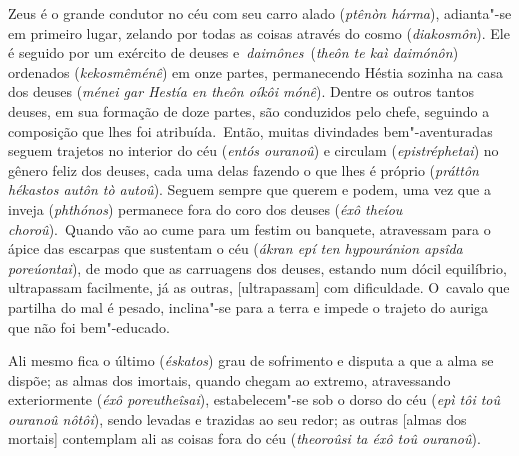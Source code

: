 Zeus é o grande condutor no céu com seu carro alado (\emph{ptênòn
hárma}), adianta"-se em primeiro lugar, zelando por todas as coisas
através do cosmo (\emph{diakosmôn}). Ele é seguido por um exército de
deuses e~\emph{daimônes}~(\emph{theôn te kaì daimónôn}) ordenados
(\emph{kekosmêménê}) em onze partes, permanecendo Héstia sozinha na casa
dos deuses (\emph{ménei gar Hestía en theôn oíkôi mónê}). \bekker{[247a]}
Dentre os outros tantos deuses, em sua formação de doze partes, são
conduzidos pelo chefe, seguindo a composição que lhes foi
atribuída.~Então, muitas divindades bem"-aventuradas seguem trajetos no
interior do céu (\emph{entós ouranoû}) e circulam (\emph{epistréphetai})
no gênero feliz dos deuses, cada uma delas fazendo o que lhes é próprio
(\emph{práttôn hékastos autôn tò autoû}). Seguem sempre que querem e
podem, uma vez que a inveja (\emph{phthónos}) permanece fora do coro dos
deuses (\emph{éxô theíou choroû}).~Quando vão ao cume para um festim ou
banquete, atravessam para o ápice das escarpas que sustentam o céu
(\emph{ákran epí ten hypouránion apsîda poreúontai}), de modo que as
carruagens dos deuses, estando num dócil equilíbrio, \bekker{[247b]}
ultrapassam facilmente, já as outras, [ultrapassam] com dificuldade.
O~cavalo que partilha do mal é pesado, inclina"-se para a terra e impede
o trajeto do auriga que não foi bem"-educado.

Ali mesmo fica o último (\emph{éskatos}) grau de sofrimento e disputa a
que a alma se dispõe; as almas dos imortais, quando chegam ao extremo,
atravessando exteriormente (\emph{éxô poreutheîsai}), estabelecem"-se sob
o dorso do céu (\emph{epì tôi toû ouranoû nôtôi}), sendo levadas e
trazidas ao seu redor; \bekker{[247c]} as outras [almas dos mortais]
contemplam ali as coisas fora do céu (\emph{theoroûsi ta éxô toû
ouranoû}).


